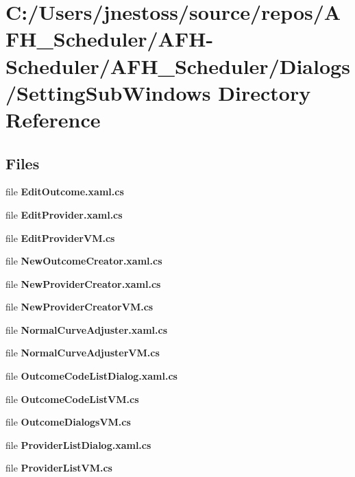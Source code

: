 \section{C\+:/\+Users/jnestoss/source/repos/\+A\+F\+H\+\_\+\+Scheduler/\+A\+F\+H-\/\+Scheduler/\+A\+F\+H\+\_\+\+Scheduler/\+Dialogs/\+Setting\+Sub\+Windows Directory Reference}
\label{dir_f7e271fe7920a82101aff4646f497ab9}
\subsection*{Files}
\begin{DoxyCompactItemize}
\item 
file \textbf{ Edit\+Outcome.\+xaml.\+cs}
\item 
file \textbf{ Edit\+Provider.\+xaml.\+cs}
\item 
file \textbf{ Edit\+Provider\+V\+M.\+cs}
\item 
file \textbf{ New\+Outcome\+Creator.\+xaml.\+cs}
\item 
file \textbf{ New\+Provider\+Creator.\+xaml.\+cs}
\item 
file \textbf{ New\+Provider\+Creator\+V\+M.\+cs}
\item 
file \textbf{ Normal\+Curve\+Adjuster.\+xaml.\+cs}
\item 
file \textbf{ Normal\+Curve\+Adjuster\+V\+M.\+cs}
\item 
file \textbf{ Outcome\+Code\+List\+Dialog.\+xaml.\+cs}
\item 
file \textbf{ Outcome\+Code\+List\+V\+M.\+cs}
\item 
file \textbf{ Outcome\+Dialogs\+V\+M.\+cs}
\item 
file \textbf{ Provider\+List\+Dialog.\+xaml.\+cs}
\item 
file \textbf{ Provider\+List\+V\+M.\+cs}
\end{DoxyCompactItemize}
